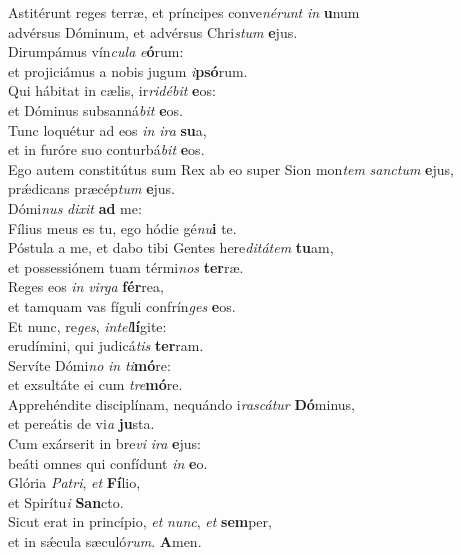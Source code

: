 \evenverse Astitérunt reges terræ, et príncipes conve\textit{né}\textit{runt} \textit{in} \textbf{u}num~\*\\
\evenverse advérsus Dóminum, et advérsus Chri\textit{stum} \textbf{e}jus.\\
\oddverse Dirumpámus vín\textit{cu}\textit{la} \textit{e}\textbf{ó}rum:~\*\\
\oddverse et projiciámus a nobis jugum \textit{i}\textbf{psó}rum.\\
\evenverse Qui hábitat in cælis, ir\textit{ri}\textit{dé}\textit{bit} \textbf{e}os:~\*\\
\evenverse et Dóminus subsanná\textit{bit} \textbf{e}os.\\
\oddverse Tunc loquétur ad eos \textit{in} \textit{i}\textit{ra} \textbf{su}a,~\*\\
\oddverse et in furóre suo conturbá\textit{bit} \textbf{e}os.\\
\evenverse Ego autem constitútus sum Rex ab eo super Sion mon\textit{tem} \textit{san}\textit{ctum} \textbf{e}jus,~\*\\
\evenverse prǽdicans præcép\textit{tum} \textbf{e}jus.\\
\oddverse Dómi\textit{nus} \textit{di}\textit{xit} \textbf{ad} me:~\*\\
\oddverse Fílius meus es tu, ego hódie gé\textit{nu}\textbf{i} te.\\
\evenverse Póstula a me, et dabo tibi Gentes here\textit{di}\textit{tá}\textit{tem} \textbf{tu}am,~\*\\
\evenverse et possessiónem tuam térmi\textit{nos} \textbf{ter}ræ.\\
\oddverse Reges eos \textit{in} \textit{vir}\textit{ga} \textbf{fér}rea,~\*\\
\oddverse et tamquam vas fíguli confrín\textit{ges} \textbf{e}os.\\
\evenverse Et nunc, re\textit{ges}, \textit{in}\textit{tel}\textbf{lí}gite:~\*\\
\evenverse erudímini, qui judicá\textit{tis} \textbf{ter}ram.\\
\oddverse Servíte Dómi\textit{no} \textit{in} \textit{ti}\textbf{mó}re:~\*\\
\oddverse et exsultáte ei cum \textit{tre}\textbf{mó}re.\\
\evenverse Apprehéndite disciplínam, nequándo i\textit{ra}\textit{scá}\textit{tur} \textbf{Dó}minus,~\*\\
\evenverse et pereátis de vi\textit{a} \textbf{ju}sta.\\
\oddverse Cum exárserit in bre\textit{vi} \textit{i}\textit{ra} \textbf{e}jus:~\*\\
\oddverse beáti omnes qui confídunt \textit{in} \textbf{e}o.\\
\evenverse Glória \textit{Pa}\textit{tri}, \textit{et} \textbf{Fí}lio,~\*\\
\evenverse et Spirítu\textit{i} \textbf{San}cto.\\
\oddverse Sicut erat in princípio, \textit{et} \textit{nunc}, \textit{et} \textbf{sem}per,~\*\\
\oddverse et in sǽcula sæculó\textit{rum}. \textbf{A}men.\\
